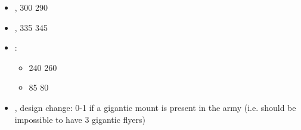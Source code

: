 \begin{itemize}
\item \wingedreapers{}, \basecost{} 300 \costdown{} 290
\item \varkolak{}, \basecost{} 335 \costup{} 345
\item \vampirespawn{}\spacebeforecolon{}:
\begin{itemize}
\item \basecost{} 240 \costup{} 260
\item \extramodel{} 85 \costdown{} 80
\end{itemize}
\item \shriekinghorror{}, design change: 0-1 if a gigantic mount is present in the army (i.e. should be impossible to have 3 gigantic flyers)
\end{itemize}

